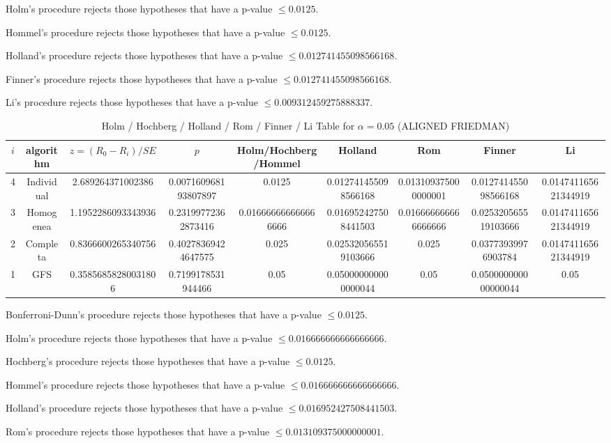 \documentclass[a4paper,10pt]{article}
\begin{document}
\begin{landscape}
Holm's procedure rejects those hypotheses that have a p-value $\le0.0125$.


Hommel's procedure rejects those hypotheses that have a p-value $\le0.0125$.


Holland's procedure rejects those hypotheses that have a p-value $\le0.012741455098566168$.


Finner's procedure rejects those hypotheses that have a p-value $\le0.012741455098566168$.


Li's procedure rejects those hypotheses that have a p-value $\le0.009312459275888337$.



\newpage

\begin{table}[!htp]
\centering\scriptsize
\caption{Holm / Hochberg / Holland / Rom / Finner / Li Table for $\alpha=0.05$ (ALIGNED FRIEDMAN)}
\begin{tabular}{ccccccccc}
$i$&algorithm&$z=(R_0 - R_i)/SE$&$p$&Holm/Hochberg/Hommel&Holland&Rom&Finner&Li\\
\hline
4&Individual&2.689264371002386&0.007160968193807897&0.0125&0.012741455098566168&0.013109375000000001&0.012741455098566168&0.014741165621344919\\
3&Homogenea&1.1952286093343936&0.23199772362873416&0.016666666666666666&0.016952427508441503&0.016666666666666666&0.025320565519103666&0.014741165621344919\\
2&Completa&0.8366600265340756&0.40278369424647575&0.025&0.025320565519103666&0.025&0.03773939976903784&0.014741165621344919\\
1&GFS&0.35856858280031806&0.7199178531944466&0.05&0.050000000000000044&0.05&0.050000000000000044&0.05\\
\hline
\end{tabular}
\end{table}
Bonferroni-Dunn's procedure rejects those hypotheses that have a p-value $\le0.0125$.


Holm's procedure rejects those hypotheses that have a p-value $\le0.016666666666666666$.


Hochberg's procedure rejects those hypotheses that have a p-value $\le0.0125$.


Hommel's procedure rejects those hypotheses that have a p-value $\le0.016666666666666666$.


Holland's procedure rejects those hypotheses that have a p-value $\le0.016952427508441503$.


Rom's procedure rejects those hypotheses that have a p-value $\le0.013109375000000001$.



\end{landscape}
\end{document}
